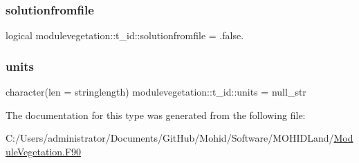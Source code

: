 \subsubsection{\texorpdfstring{solutionfromfile}{solutionfromfile}}
{\footnotesize\ttfamily logical modulevegetation\+::t\+\_\+id\+::solutionfromfile = .false.\hspace{0.3cm}{\ttfamily [private]}}

\mbox{\label{structmodulevegetation_1_1t__id_a3d2ee5611e1df630b451295fb201a560}} 
\subsubsection{\texorpdfstring{units}{units}}
{\footnotesize\ttfamily character(len = stringlength) modulevegetation\+::t\+\_\+id\+::units = null\+\_\+str\hspace{0.3cm}{\ttfamily [private]}}



The documentation for this type was generated from the following file\+:\begin{DoxyCompactItemize}
\item 
C\+:/\+Users/administrator/\+Documents/\+Git\+Hub/\+Mohid/\+Software/\+M\+O\+H\+I\+D\+Land/\mbox{\hyperlink{_module_vegetation_8_f90}{Module\+Vegetation.\+F90}}\end{DoxyCompactItemize}
